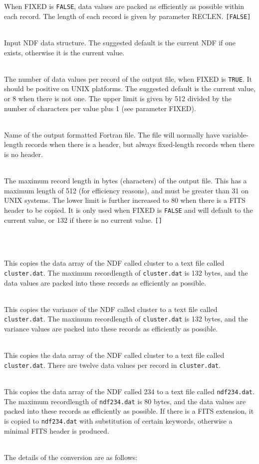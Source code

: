 \documentclass[twoside,11pt]{article}
\newcommand{\htmlref}[2]{#1}
\newlength{\sstexampleslength}
\newcommand{\sstexamples}[1]{
   \goodbreak
   \item[Examples:] \mbox{} \\
   \vspace{-3.5ex}
   \begin{description}
      #1
   \end{description}
}
\newcommand{\sstsubsection}[1]{ \item[{#1}] \mbox{} \\}
\newcommand{\sstexamplesubsection}[2]{\sloppy
\item[\parbox{\sstexampleslength}{\ssttt #1}] \mbox{} \vspace{0.5ex}
\\ #2 \vspace{1.0ex}}
\newcommand{\sstnotes}[1]{\pagebreak[3] \item[Notes:] \mbox{} \\[1.3ex] #1}
\newcommand{\ssthitemlist}[1]{
  \latexonly{
  \mbox{} \\
  \vspace{-3.5ex}
  }
  \begin{itemize}
     #1
  \end{itemize}
}
\newcommand{\sstexamples}[1]{
   \item[\vspace{0.35ex}\htmlref{Examples:\vspace{-0.5ex}}{app_example}]
      \begin{description}
         #1
      \end{description}
      \\
   }
\newcommand{\sstsubsection}[1]{\item[{#1}]}
\newcommand{\sstexamplesubsection}[2]{
   \vspace{-1.0ex} \item[{\ssttt #1}] #2 \vspace{0.2ex}}
\newcommand{\sstnotes}[1]{\item[Notes:]
      \begin{description}
         #1
      \end{description}
   }
\begin{document}
{{{         When FIXED is \texttt{FALSE}, data values are packed as efficiently
         as possible within each record.  The length of each record is
         given by parameter RECLEN.  \texttt{[FALSE]}
      }
      \sstsubsection{
         IN = NDF (Read)
      }{
         Input NDF data structure. The suggested default is the current
         NDF if one exists, otherwise it is the current value.
      }
      \sstsubsection{
         NOPEREC = \_INTEGER (Read)
      }{
         The number of data values per record of the output file, when
         FIXED is \texttt{TRUE}.  It should be positive on UNIX platforms.
         The suggested default is the current value, or 8 when there
         is not one.  The upper limit is given by 512 divided by the
         number of characters per value plus 1 (see parameter FIXED).
      }
      \sstsubsection{
         OUT = FILENAME (Write)
      }{
         Name of the output formatted Fortran file.  The file will
         normally have variable-length records when there is a header,
         but always fixed-length records when there is no header.
      }
      \sstsubsection{
         RECLEN = \_INTEGER (Read)
      }{
         The maximum record length in bytes (characters) of the output
         file.  This has a maximum length of 512 (for efficiency
         reasons), and must be greater than 31 on UNIX systems.  The
         lower limit is further increased to 80 when there is a FITS
         header to be copied.  It is only used when FIXED is \texttt{FALSE} and
         will default to the current value, or 132 if there is no
         current value.  \texttt{[]}
      }
   }
   \sstexamples{
      \sstexamplesubsection{
         ndf2ascii cluster cluster.dat
      }{
         This copies the data array of the NDF called cluster to a text
         file called \texttt{cluster.dat}.  The maximum recordlength of
         \texttt{cluster.dat} is 132 bytes, and the data values are packed into
         these records as efficiently as possible.
      }
      \sstexamplesubsection{
         ndf2ascii cluster cluster.dat v
      }{
         This copies the variance of the NDF called cluster to a
         text file called \texttt{cluster.dat}.  The maximum recordlength of
         \texttt{cluster.dat} is 132 bytes, and the variance values are packed
         into these records as efficiently as possible.
      }
      \sstexamplesubsection{
         ndf2ascii cluster cluster.dat fixed noperec=12
      }{
         This copies the data array of the NDF called cluster to a
         text file called \texttt{cluster.dat}.  There are twelve data values
         per record in \texttt{cluster.dat}.
      }
      \sstexamplesubsection{
         ndf2ascii out=ndf234.dat fits reclen=80 in=@234
      }{
         This copies the data array of the NDF called 234 to a
         text file called \texttt{ndf234.dat}.  The maximum recordlength of
         \texttt{ndf234.dat} is 80 bytes, and the data values are packed into
         these records as efficiently as possible.  If there is a FITS
         extension, it is copied to \texttt{ndf234.dat} with substitution of
         certain keywords, otherwise a minimal FITS header is produced.
      }
   }
   \sstnotes{
      The details of the conversion are as follows:
      \ssthitemlist{

}}}
\end{document}
